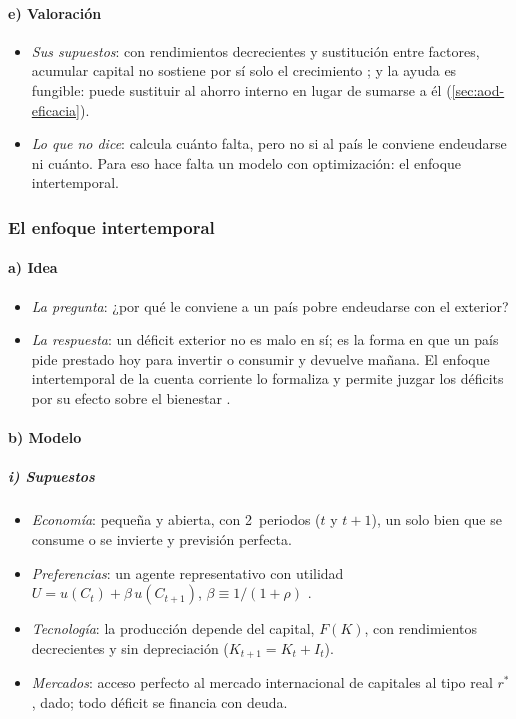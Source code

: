 \documentclass[11pt]{article}
\begin{document}
\paragraph{e) Valoración}

\begin{itemize}
\item \emph{Sus supuestos}: con rendimientos decrecientes y sustitución entre factores, acumular capital no sostiene por sí solo el crecimiento ; y la ayuda es fungible: puede sustituir al ahorro interno en lugar de sumarse a él (\ref{sec:aod-eficacia}).
\item \emph{Lo que no dice}: calcula cuánto falta, pero no si al país le conviene endeudarse ni cuánto. Para eso hace falta un modelo con optimización: el enfoque intertemporal.
\end{itemize}

\subsubsection{El enfoque intertemporal}\label{sec:intertemporal}

\paragraph{a) Idea}

\begin{itemize}
\item \emph{La pregunta}: ¿por qué le conviene a un país pobre endeudarse con el exterior?
\item \emph{La respuesta}: un déficit exterior no es malo en sí; es la forma en que un país pide prestado hoy para invertir o consumir y devuelve mañana. El enfoque intertemporal de la cuenta corriente lo formaliza y permite juzgar los déficits por su efecto sobre el bienestar\nocite{ObstfeldRogoff1996Foundations} .
\end{itemize}

\paragraph{b) Modelo}

\subparagraph{i) Supuestos}

\begin{itemize}
\item \emph{Economía}: pequeña y abierta, con 2~periodos ($t$ y $t+1$), un solo bien que se consume o se invierte y previsión perfecta.
\item \emph{Preferencias}: un agente representativo con utilidad $U=u(C_t)+\beta\,u(C_{t+1})$, $\beta\equiv1/(1+\rho)$ .
\item \emph{Tecnología}: la producción depende del capital, $F(K)$, con rendimientos decrecientes y sin depreciación ($K_{t+1}=K_t+I_t$).
\item \emph{Mercados}: acceso perfecto al mercado internacional de capitales al tipo real $r^*$, dado; todo déficit se financia con deuda.
\end{itemize}
\end{document}
